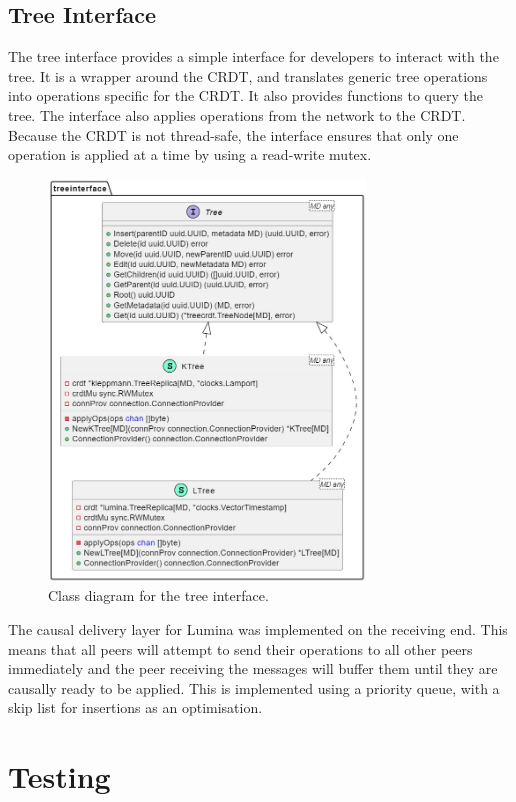 \documentclass[12pt]{report}
\begin{document}
\section{Tree Interface}
The tree interface provides a simple interface for developers to interact with the tree. It is a wrapper around the CRDT, and translates generic tree operations into operations specific for the CRDT. It also provides functions to query the tree. The interface also applies operations from the network to the CRDT. Because the CRDT is not thread-safe, the interface ensures that only one operation is applied at a time by using a read-write mutex. \par
\begin{figure}[H]
    \centering
    \includegraphics[width=0.75\textwidth]{images/treeinterface_impl.jpg}
    \caption{Class diagram for the tree interface.}
    \label{fig:treeimpl}
\end{figure}

The causal delivery layer for Lumina was implemented on the receiving end. This means that all peers will attempt to send their operations to all other peers immediately and the peer receiving the messages will buffer them until they are causally ready to be applied. This is implemented using a priority queue, with a skip list for insertions as an optimisation.

\chapter{Testing}
\end{document}
